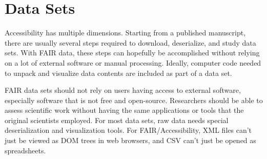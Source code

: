 
\section{Data Sets}\fbeg{}\begin{frame}{}

{\fontsize{20}{22}\selectfont

\hspace*{-2pt}\begin{ftxt}[0.95\textwidth]

Accessibility has multiple dimensions.  Starting from a published 
manuscript, there are usually several steps required to download, 
deserialize, and study data sets.  With FAIR data, these steps 
can hopefully be accomplished without relying on 
a lot of external software or manual processing.  
Ideally, computer code needed to unpack and visualize 
data contents are included as part of a data set.\\\vspace{-13pt}

FAIR data sets should not rely on users having access to 
external software, especially software that is not 
free and open-source.  Researchers should be able 
to assess scientific work without having the same 
applications or tools that the original scientists employed.
For most data sets, raw data needs special deserialization 
and visualization tools.  For FAIR/Accessibility, 
XML files can't just be viewed as DOM trees in web 
browsers, and CSV can't just be opened as spreadsheets.


\end{ftxt}

}

\end{frame}

